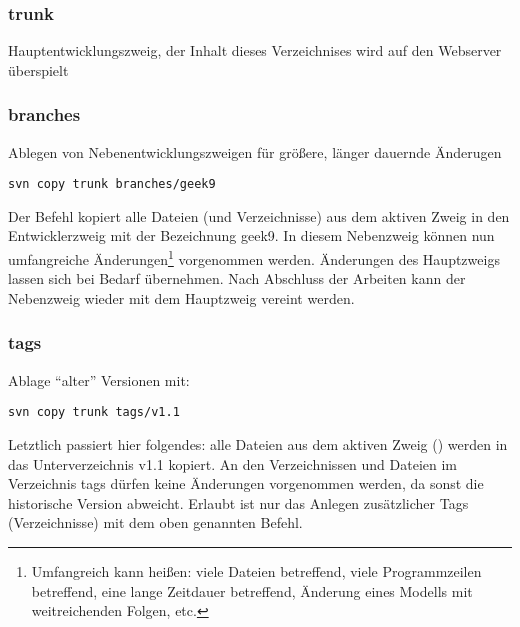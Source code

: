 \documentclass[
  final,      %
  idxtotoc,   %
  tocleft,    %
  a4paper,    %
  abstracton, %
  titlepage,  %
  oneside,    %
  DIVcalc
]{scrartcl}
\newcommand{\ABSCHNITTSTRENNER}{\cleardoublepage }
\begin{document}
\subsubsection{trunk}\label{sec:trunk}
Hauptentwicklungszweig, der Inhalt dieses Verzeichnises wird auf den
Webserver überspielt

\subsubsection{branches}
Ablegen von Nebenentwicklungszweigen für größere, länger dauernde
Änderugen

\begin{Verbatim}
svn copy trunk branches/geek9
\end{Verbatim}

Der Befehl kopiert alle Dateien (und Verzeichnisse) aus dem aktiven
Zweig in den Entwicklerzweig mit der Bezeichnung geek9. In diesem
Nebenzweig können nun umfangreiche Änderungen\footnote{Umfangreich kann
  heißen: viele Dateien betreffend, viele Programmzeilen betreffend,
  eine lange Zeitdauer betreffend, Änderung eines Modells mit
  weitreichenden Folgen, etc.}  vorgenommen werden. Änderungen des
Hauptzweigs lassen sich bei Bedarf übernehmen. Nach Abschluss der
Arbeiten kann der Nebenzweig wieder mit dem Hauptzweig vereint werden.

\subsubsection{tags}
Ablage \enquote{alter} Versionen mit:

\begin{Verbatim}
svn copy trunk tags/v1.1
\end{Verbatim}

Letztlich passiert hier folgendes: alle Dateien aus dem aktiven Zweig
() werden in das Unterverzeichnis v1.1 kopiert. An den
Verzeichnissen und Dateien im Verzeichnis tags dürfen keine Änderungen
vorgenommen werden, da sonst die historische Version abweicht. Erlaubt
ist nur das Anlegen zusätzlicher Tags (Verzeichnisse) mit dem oben
genannten Befehl.


\ABSCHNITTSTRENNER
\appendix
{}


\ABSCHNITTSTRENNER
{}
\renewcommand*{\indexpagestyle}{scrheadings}
\printindex

%
\end{document}
